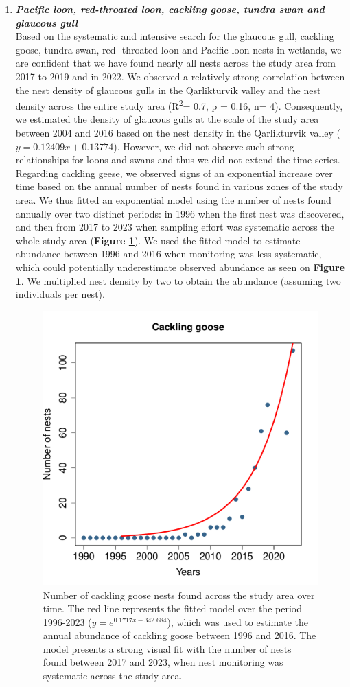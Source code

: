 \documentclass[a4paper,twoside,12pt]{article}
\begin{document}
        \begin{enumerate}[label=\alph*.]       
     \item[] \textit{\textbf{Pacific loon, red-throated loon, cackling goose, tundra swan and glaucous gull}}   \\
Based on the systematic and intensive search for the glaucous gull, cackling goose, tundra swan, red- throated loon and Pacific loon nests in wetlands, we are confident that we have found nearly all nests across the study area from 2017 to 2019 and in 2022. We observed a relatively strong correlation between the nest density of glaucous gulls in the Qarlikturvik valley and the nest density across the entire study area (R\textsuperscript{2}= 0.7, p = 0.16, n= 4). Consequently, we estimated the density of glaucous gulls at the scale of the study area between 2004 and 2016 based on the nest density in the Qarlikturvik valley ($y = 0.12409x + 0.13774$). However, we did not observe such strong relationships for loons and swans and thus we did not extend the time series. Regarding cackling geese, we observed signs of an exponential increase over time based on the annual number of nests found in various zones of the study area. We thus fitted an exponential model using the number of nests found annually over two distinct periods: in 1996 when the first nest was discovered, and then from 2017 to 2023 when sampling effort was systematic across the whole study area (\textbf{Figure \ref{figure:cackling}}). We used the fitted model to estimate abundance between 1996 and 2016 when monitoring was less systematic, which could potentially underestimate observed abundance as seen on \textbf{Figure \ref{figure:cackling}}. We multiplied nest density by two to obtain the abundance (assuming two individuals per nest). 

\begin{figure}[h]
\centering
\includegraphics[width=0.6\linewidth]{figures/cackling_goose_nest_exponential.pdf} 
\caption{Number of cackling goose nests found across the study area over time. The red line represents the fitted model over the period 1996-2023 ($y= e^{0.1717x-342.684}$), which was used to estimate the annual abundance of cackling goose between 1996 and 2016. The model presents a strong visual fit with the number of nests found between 2017 and 2023, when nest monitoring was systematic across the study area.}
\label{figure:cackling}
\end{figure}


\end{enumerate}
\end{document}

